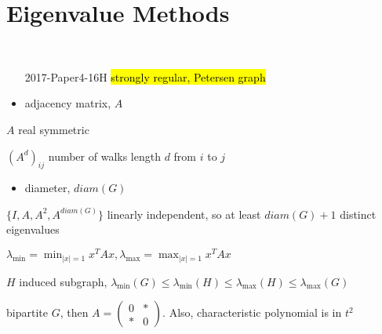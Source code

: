 \section{Eigenvalue Methods}\label{sec:eigenvalue-methods}

\begin{exam}
    \,
    \begin{enumerate}
        \item[2017-Paper4-16H] \hl{strongly regular, Petersen graph}
    \end{enumerate}
\end{exam}

\begin{itemize}
    \item adjacency matrix, $A$
\end{itemize}

\begin{fact}
    $A$ real symmetric
\end{fact}

\begin{fact}
    $(A^d)_{ij}$ number of walks length $d$ from $i$ to $j$
\end{fact}

\begin{itemize}
    \item diameter, $diam(G)$
\end{itemize}

\begin{fact}
    $\{I, A, A^2, A^{diam(G)}\}$ linearly independent, so at least $diam(G) + 1$ distinct eigenvalues
\end{fact}

\begin{fact}
    $\lambda_{\min} = \min_{|x|=1}x^{T}Ax, \lambda_{\max} = \max_{|x|=1}x^T Ax$
\end{fact}

\begin{fact}
    $H$ induced subgraph, $\lambda_{\min}(G) \leq \lambda_{\min}(H) \leq \lambda_{\max}(H) \leq \lambda_{\max}(G)$
\end{fact}

\begin{fact}
    bipartite $G$, then $A =
    \begin{pmatrix}
        0 & * \\
        * & 0
    \end{pmatrix}$.
    Also, characteristic polynomial is in $t^2$
\end{fact}

